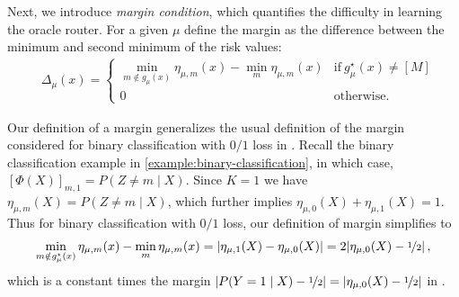 



Next, we introduce \emph{margin condition}, which quantifies the difficulty in learning the oracle router.  For a given $\mu$ define the margin as the difference between the minimum and second minimum of the risk values: 
{ \begin{equation}\label{eq:margin}
    \begin{aligned}
        & \textstyle \Delta_\mu(x) =  
    \begin{cases}
       \min\limits_{m \notin g_\mu(x)} \eta_{\mu, m}(x) - \min\limits_m \eta_{\mu, m}(x) & \text{if} ~ g_\mu^\star(x) \neq [M]\\ 
       0 & \text{otherwise}.
       \end{cases} 
    \end{aligned}
\end{equation}}

\noindent Our definition of a margin generalizes the usual definition of the margin considered for binary classification with $0/1$ loss in \citet{audibert2007Fast}. Recall the binary classification example in \ref{example:binary-classification}, in which case, 
$[\Phi(X)]_{m , 1} =  P(Z \neq m\mid X) $. Since $K = 1$ we have 
$\eta_{\mu, m}(X) = P(Z \neq m\mid X) $, which further implies $\eta_{\mu, 0}(X) + \eta_{\mu, 1}(X) = 1$.
Thus for binary classification with $0/1$ loss, our definition of margin simplifies to 
\begin{align*}
\textstyle \min\limits_{m \notin g_\mu^\star(x)} \eta_{\mu, m}(x) - \min\limits_m \eta_{\mu, m}(x)
=  |\eta_{\mu, 1}(X) - \eta_{\mu, 0}(X)| = 2 |\eta_{\mu, 0}(X) - \nicefrac{1}{2}| \,,
\end{align*}
which is a constant times the margin $  |P(Y = 1\mid X) - \nicefrac{1}{2}| = |\eta_{\mu, 0}(X) - \nicefrac{1}{2}| $ in \citet{audibert2007Fast}. 


